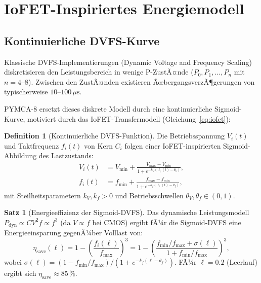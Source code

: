﻿\documentclass[a4paper,12pt]{scrreprt}
\theoremstyle{definition}
\newtheorem{definition}{Definition}[section]
\newtheorem{satz}{Satz}[section]
\begin{document}
	\section{IoFET-Inspiriertes Energiemodell}
	\label{sec:energy}
	
	\subsection{Kontinuierliche DVFS-Kurve}
	
	Klassische DVFS-Implementierungen (Dynamic Voltage and Frequency Scaling)
	diskretisieren den Leistungsbereich in wenige P-ZustÃ¤nde
	($P_0, P_1, \ldots, P_n$ mit $n = 4$--$8$). Zwischen den ZustÃ¤nden
	existieren ÃœbergangsverzÃ¶gerungen von typischerweise $10$--$100\,\mu\mathrm{s}$.
	
	PYMCA-8 ersetzt dieses diskrete Modell durch eine kontinuierliche
	Sigmoid-Kurve, motiviert durch das IoFET-Transfermodell
	(Gleichung~\eqref{eq:iofet}):
	
	\begin{definition}[Kontinuierliche DVFS-Funktion]
		\label{def:continuous_dvfs}
		Die Betriebsspannung $V_i(t)$ und Taktfrequenz $f_i(t)$ von Kern $C_i$
		folgen einer IoFET-inspirierten Sigmoid-Abbildung des Lastzustands:
		\begin{align}
			V_i(t) &= V_{\min} + \frac{V_{\max} - V_{\min}}{1 + e^{-k_V(\ell_i(t) - \theta_V)}},
			\label{eq:voltage} \\
			f_i(t) &= f_{\min} + \frac{f_{\max} - f_{\min}}{1 + e^{-k_f(\ell_i(t) - \theta_f)}},
			\label{eq:freq}
		\end{align}
		mit Steilheitsparametern $k_V, k_f > 0$ und Betriebsschwellen
		$\theta_V, \theta_f \in (0,1)$.
	\end{definition}
	
	\begin{satz}[Energieeffizienz der Sigmoid-DVFS]
		\label{satz:sigmoid_eff}
		Das dynamische Leistungsmodell $P_{\mathrm{dyn}} \propto C V^2 f \propto f^3$
		(da $V \propto f$ bei CMOS) ergibt fÃ¼r die Sigmoid-DVFS eine
		Energieeinsparung gegenÃ¼ber Volllast von:
		\[
		\eta_{\mathrm{save}}(\ell) = 1 - \left(\frac{f_i(\ell)}{f_{\max}}\right)^3
		= 1 - \left(\frac{f_{\min}/f_{\max} + \sigma(\ell)}{1 + f_{\min}/f_{\max}}\right)^3,
		\]
		wobei $\sigma(\ell) = (1 - f_{\min}/f_{\max})/(1 + e^{-k_f(\ell - \theta_f)})$.
		FÃ¼r $\ell = 0.2$ (Leerlauf) ergibt sich $\eta_{\mathrm{save}} \approx 85\,\%$.
	\end{satz}
	
\end{document}
